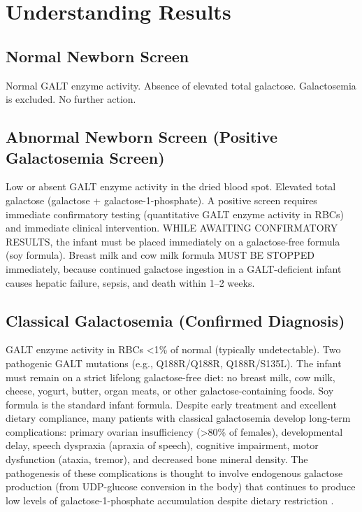 \section*{Understanding Results}

\subsection*{Normal Newborn Screen}
Normal GALT enzyme activity. Absence of elevated total galactose. Galactosemia is excluded. No further action.

\subsection*{Abnormal Newborn Screen (Positive Galactosemia Screen)}
Low or absent GALT enzyme activity in the dried blood spot. Elevated total galactose (galactose + galactose-1-phosphate). A positive screen requires immediate confirmatory testing (quantitative GALT enzyme activity in RBCs) and immediate clinical intervention. WHILE AWAITING CONFIRMATORY RESULTS, the infant must be placed immediately on a galactose-free formula (soy formula). Breast milk and cow milk formula MUST BE STOPPED immediately, because continued galactose ingestion in a GALT-deficient infant causes hepatic failure, sepsis, and death within 1--2 weeks.

\subsection*{Classical Galactosemia (Confirmed Diagnosis)}
GALT enzyme activity in RBCs <1\% of normal (typically undetectable). Two pathogenic GALT mutations (e.g., Q188R/Q188R, Q188R/S135L). The infant must remain on a strict lifelong galactose-free diet: no breast milk, cow milk, cheese, yogurt, butter, organ meats, or other galactose-containing foods. Soy formula is the standard infant formula. Despite early treatment and excellent dietary compliance, many patients with classical galactosemia develop long-term complications: primary ovarian insufficiency (>80\% of females), developmental delay, speech dyspraxia (apraxia of speech), cognitive impairment, motor dysfunction (ataxia, tremor), and decreased bone mineral density. The pathogenesis of these complications is thought to involve endogenous galactose production (from UDP-glucose conversion in the body) that continues to produce low levels of galactose-1-phosphate accumulation despite dietary restriction \cite{berry2021classic}.

